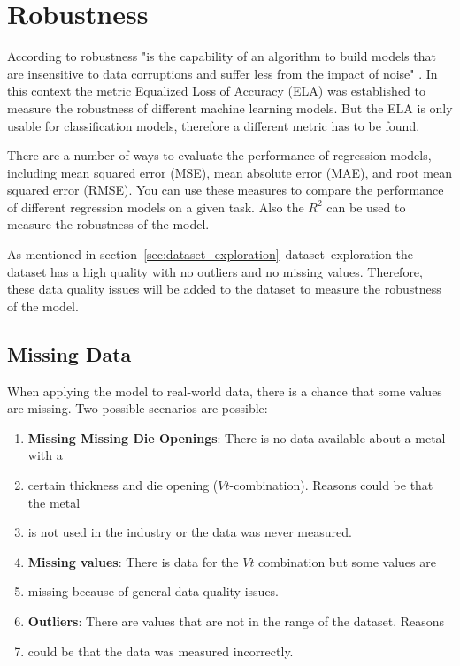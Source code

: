 

\label{sec:robustness}


\section{Robustness}


According to \cite{saez_evaluatingclassifierbehavior_2016} robustness "is the capability of an
algorithm to build models that are insensitive to data corruptions and suffer less from the
impact of noise" \cite[p. 2]{saez_evaluatingclassifierbehavior_2016}.
In this context the metric Equalized Loss of Accuracy (\ac{ELA}) was established to measure the
robustness of different machine learning models. But the \ac{ELA} is only usable for
classification models, therefore a different metric has to be found.

There are a number of ways to evaluate the performance of regression models, including mean
squared error (MSE), mean absolute error (MAE), and root mean squared error (RMSE). You can use
these measures to compare the performance of different regression models on a given task. Also
the $R^2$ can be used to measure the robustness of the model.

As mentioned in section~\ref{sec:dataset_exploration}~dataset~exploration the dataset has a high
quality with no outliers and no missing values.
Therefore, these data quality issues will be added to the dataset to measure the robustness of
the model.

\subsection{Missing Data}
When applying the model to real-world data, there is a chance that some values are missing. Two
possible scenarios are possible:

\begin{enumerate}
    \item \textbf{Missing Missing Die Openings}: There is no data available about a metal with a
    \item certain thickness and die opening ($Vt$-combination). Reasons could be that the metal
    \item is not used in the industry or the data was never measured.
    \item \textbf{Missing values}: There is data for the $Vt$ combination but some values are
    \item missing because of general data quality issues.
    \item \textbf{Outliers}: There are values that are not in the range of the dataset. Reasons
    \item could be that the data was measured incorrectly.
\end{enumerate}

